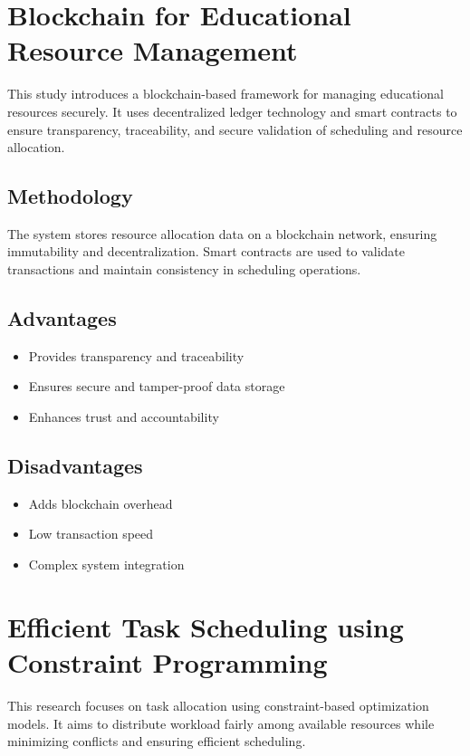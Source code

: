 \documentclass[a4paper, 12pt]{report}
\begin{document}

\section{Blockchain for Educational Resource Management }
\par This study introduces a blockchain-based framework for managing educational resources securely. It uses decentralized ledger technology and smart contracts to ensure transparency, traceability, and secure validation of scheduling and resource allocation.

\subsection{Methodology}
\par The system stores resource allocation data on a blockchain network, ensuring immutability and decentralization. Smart contracts are used to validate transactions and maintain consistency in scheduling operations.

\subsection{Advantages}
\begin{itemize}
    \item Provides transparency and traceability
    \item Ensures secure and tamper-proof data storage
    \item Enhances trust and accountability
\end{itemize}

\subsection{Disadvantages}
\begin{itemize}
    \item Adds blockchain overhead
    \item Low transaction speed
    \item Complex system integration
\end{itemize}


\section{Efficient Task Scheduling using Constraint Programming}
\par This research focuses on task allocation using constraint-based optimization models. It aims to distribute workload fairly among available resources while minimizing conflicts and ensuring efficient scheduling.
\end{document}
